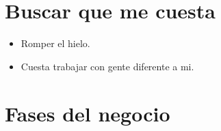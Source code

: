 \section{Buscar que me cuesta}
\begin{itemize}
    \item Romper el hielo. 
    \item Cuesta trabajar con gente diferente a mi.
\end{itemize}

\section{Fases del negocio}
